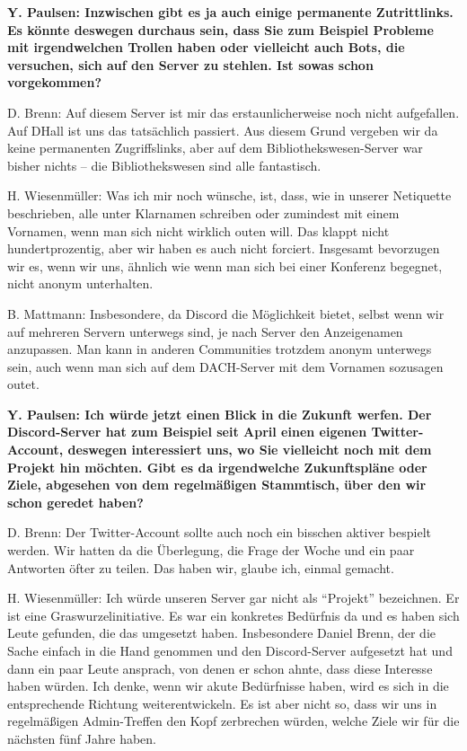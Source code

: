\documentclass[a4paper,
fontsize=11pt,
oneside,
numbers=noperiodatend,
parskip=half-,
bibliography=totoc,
final
]{scrartcl}
\begin{document}
\textbf{Y. Paulsen: Inzwischen gibt es ja auch einige permanente
Zutrittlinks. Es könnte deswegen durchaus sein, dass Sie zum Beispiel
Probleme mit irgendwelchen Trollen haben oder vielleicht auch Bots, die
versuchen, sich auf den Server zu stehlen. Ist sowas schon vorgekommen?}

D. Brenn: Auf diesem Server ist mir das erstaunlicherweise noch nicht
aufgefallen. Auf DHall ist uns das tatsächlich passiert. Aus diesem
Grund vergeben wir da keine permanenten Zugriffslinks, aber auf dem
Bibliothekswesen-Server war bisher nichts -- die Bibliothekswesen sind
alle fantastisch.

H. Wiesenmüller: Was ich mir noch wünsche, ist, dass, wie in unserer
Netiquette beschrieben, alle unter Klarnamen schreiben oder zumindest
mit einem Vornamen, wenn man sich nicht wirklich outen will. Das klappt
nicht hundertprozentig, aber wir haben es auch nicht forciert. Insgesamt
bevorzugen wir es, wenn wir uns, ähnlich wie wenn man sich bei einer
Konferenz begegnet, nicht anonym unterhalten.

B. Mattmann: Insbesondere, da Discord die Möglichkeit bietet, selbst
wenn wir auf mehreren Servern unterwegs sind, je nach Server den
Anzeigenamen anzupassen. Man kann in anderen Communities trotzdem anonym
unterwegs sein, auch wenn man sich auf dem DACH-Server mit dem Vornamen
sozusagen outet.

\textbf{Y. Paulsen: Ich würde jetzt einen Blick in die Zukunft werfen.
Der Discord-Server hat zum Beispiel seit April einen eigenen
Twitter-Account, deswegen interessiert uns, wo Sie vielleicht noch mit
dem Projekt hin möchten. Gibt es da irgendwelche Zukunftspläne oder
Ziele, abgesehen von dem regelmäßigen Stammtisch, über den wir schon
geredet haben?}

D. Brenn: Der Twitter-Account sollte auch noch ein bisschen aktiver
bespielt werden. Wir hatten da die Überlegung, die Frage der Woche und
ein paar Antworten öfter zu teilen. Das haben wir, glaube ich, einmal
gemacht.

H. Wiesenmüller: Ich würde unseren Server gar nicht als
\enquote{Projekt} bezeichnen. Er ist eine Graswurzelinitiative. Es war
ein konkretes Bedürfnis da und es haben sich Leute gefunden, die das
umgesetzt haben. Insbesondere Daniel Brenn, der die Sache einfach in die
Hand genommen und den Discord-Server aufgesetzt hat und dann ein paar
Leute ansprach, von denen er schon ahnte, dass diese Interesse haben
würden. Ich denke, wenn wir akute Bedürfnisse haben, wird es sich in die
entsprechende Richtung weiterentwickeln. Es ist aber nicht so, dass wir
uns in regelmäßigen Admin-Treffen den Kopf zerbrechen würden, welche
Ziele wir für die nächsten fünf Jahre haben.
\end{document}

